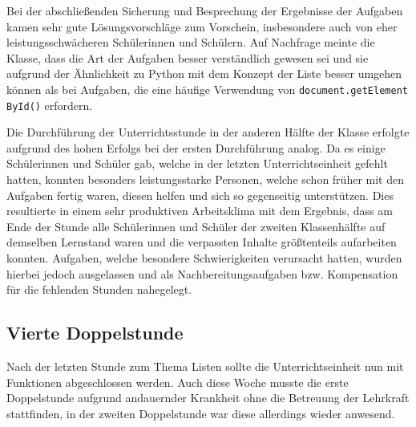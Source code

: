 Bei der abschließenden Sicherung und Besprechung der Ergebnisse der Aufgaben kamen sehr gute Lösungsvorschläge zum Vorschein, insbesondere auch von eher leistungsschwächeren Schülerinnen und Schülern.
Auf Nachfrage meinte die Klasse, dass die Art der Aufgaben besser verständlich gewesen sei und sie aufgrund der Ähnlichkeit zu Python mit dem Konzept der Liste besser umgehen können als bei Aufgaben, die eine häufige Verwendung von \texttt{document.getElement} \texttt{ById()} erfordern.

Die Durchführung der Unterrichtsstunde in der anderen Hälfte der Klasse erfolgte aufgrund des hohen Erfolgs bei der ersten Durchführung analog.
Da es einige Schülerinnen und Schüler gab, welche in der letzten Unterrichtseinheit gefehlt hatten, konnten besonders leistungsstarke Personen, welche schon früher mit den Aufgaben fertig waren, diesen helfen und sich so gegenseitig unterstützen.
Dies resultierte in einem sehr produktiven Arbeitsklima mit dem Ergebnis, dass am Ende der Stunde alle Schülerinnen und Schüler der zweiten Klassenhälfte auf demselben Lernstand waren und die verpassten Inhalte größtenteils aufarbeiten konnten.
Aufgaben, welche besondere Schwierigkeiten verursacht hatten, wurden hierbei jedoch ausgelassen und als Nachbereitungsaufgaben bzw. Kompensation für die fehlenden Stunden nahegelegt.


\subsection{Vierte Doppelstunde}
\label{subsec:doppelstunde-4}

Nach der letzten Stunde zum Thema Listen sollte die Unterrichtseinheit nun mit Funktionen abgeschlossen werden.
Auch diese Woche musste die erste Doppelstunde aufgrund andauernder Krankheit ohne die Betreuung der Lehrkraft stattfinden, in der zweiten Doppelstunde war diese allerdings wieder anwesend.

